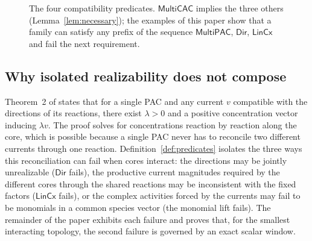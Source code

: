 \documentclass[11pt,a4paper]{article}
\theoremstyle{plain}
\theoremstyle{definition}
\theoremstyle{remark}
\newcommand{\MPAC}{\mathsf{MultiPAC}}
\newcommand{\MCAC}{\mathsf{MultiCAC}}
\newcommand{\DIR}{\mathsf{Dir}}
\newcommand{\LIN}{\mathsf{LinCx}}
\begin{document}
\begin{figure}[t]
\centering
{}
\caption{The four compatibility predicates. $\MCAC$ implies the three others (Lemma~\ref{lem:necessary}); the examples of this paper show that a family can satisfy any prefix of the sequence $\MPAC$, $\DIR$, $\LIN$ and fail the next requirement.}
\label{fig:layers}
\end{figure}

\subsection{Why isolated realizability does not compose}

Theorem~2 of \citep{kosc2025} states that for a single PAC and any current $v$ compatible with the directions of its reactions, there exist $\lambda>0$ and a positive concentration vector inducing $\lambda v$. The proof solves for concentrations reaction by reaction along the core, which is possible because a single PAC never has to reconcile two different currents through one reaction. Definition~\ref{def:predicates} isolates the three ways this reconciliation can fail when cores interact: the directions may be jointly unrealizable ($\DIR$ fails), the productive current magnitudes required by the different cores through the shared reactions may be inconsistent with the fixed factors ($\LIN$ fails), or the complex activities forced by the currents may fail to be monomials in a common species vector (the monomial lift fails). The remainder of the paper exhibits each failure and proves that, for the smallest interacting topology, the second failure is governed by an exact scalar window.
\end{document}
